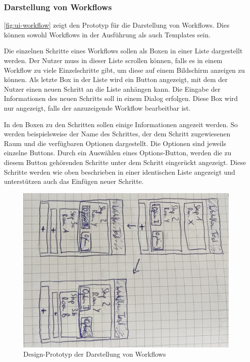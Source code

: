 \FloatBarrier

\subsubsection{Darstellung von Workflows}

\autoref{fig:ui-workflow} zeigt den Prototyp für die Darstellung von Workflows.
Dies können sowohl Workflows in der Ausführung als auch Templates sein.

Die einzelnen Schritte eines Workflows sollen als Boxen in einer Liste dargestellt werden.
Der Nutzer muss in dieser Liste scrollen können, falls es in einem Workflow zu viele Einzelschritte
gibt, um diese auf einem Bildschirm anzeigen zu können.
Als letzte Box in der Liste wird ein Button angezeigt, mit dem der Nutzer einen neuen Schritt an die Liste anhängen kann.
Die Eingabe der Informationen des neuen Schritts soll in einem Dialog erfolgen.
Diese Box wird nur angezeigt, falls der anzuzeigende Workflow bearbeitbar ist.

In den Boxen zu den Schritten sollen einige Informationen angezeit werden.
So werden beispielsweise der Name des Schrittes, der dem Schritt zugewiesenen Raum und die
verfügbaren Optionen dargestellt.
Die Optionen sind jeweils einzelne Buttons.
Durch ein Auswählen eines Options-Button, werden die zu diesem Button gehörenden Schritte unter dem Schritt eingerückt angezeigt.
Diese Schritte werden wie oben beschrieben in einer identischen Liste angezeigt und unterstützen auch das Einfügen neuer Schritte.

\begin{figure}[h!tbp]
	\includegraphics[width=.7\textwidth]{images/ui-prototype/workflow.jpg}
	\centering
	\caption{Design-Prototyp der Darstellung von Workflows}
	\label{fig:ui-workflow}
\end{figure}

